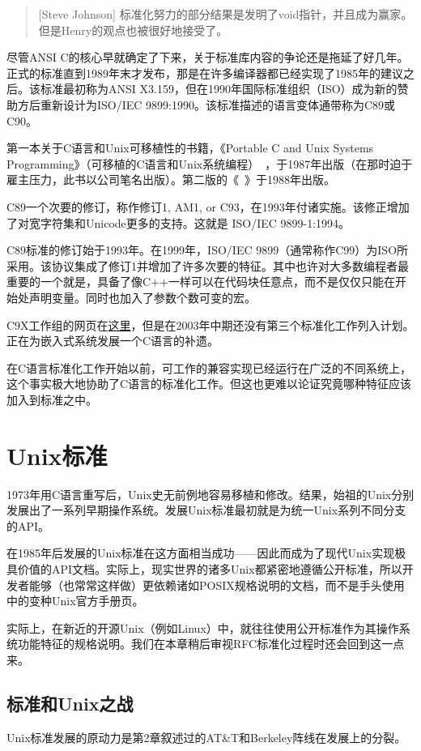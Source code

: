 \documentclass[12pt,oneside]{ctexbook}
\begin{document}
\begin{common-format}
\begin{quote}[Steve Johnson]
标准化努力的部分结果是发明了void指针，并且成为赢家。但是Henry的观点也被很好地接受了。
\end{quote}

尽管ANSI C的核心早就确定了下来，关于标准库内容的争论还是拖延了好几年。正式的标准直到1989年末才发布，那是在许多编译器都已经实现了1985年的建议之后。该标准最初称为ANSI X3.159，但在1990年国际标准组织（ISO）成为新的赞助方后重新设计为ISO/IEC 9899:1990。该标准描述的语言变体通带称为C89或C90。

第一本关于C语言和Unix可移植性的书籍，《Portable C and Unix Systems Programming》（可移植的C语言和Unix系统编程）~\cite{Lapin}，于1987年出版（在那时迫于雇主压力，此书以公司笔名出版）。第二版的《~\cite{Kernighan-Ritchie}》于1988年出版。

C89一个次要的修订，称作修订1, AM1, or C93，在1993年付诸实施。该修正增加了对宽字符集和Unicode更多的支持。这就是 ISO/IEC 9899-1:1994。

C89标准的修订始于1993年。在1999年，ISO/IEC 9899（通常称作C99）为ISO所采用。该协议集成了修订1并增加了许多次要的特征。其中也许对大多数编程者最重要的一个就是，具备了像C++一样可以在代码块任意点，而不是仅仅只能在开始处声明变量。同时也加入了参数个数可变的宏。

C9X工作组的网页在\href{http://anubis.dkuug.dk/JTC1/SC22/WG14/www/projects}{这里}，但是在2003年中期还没有第三个标准化工作列入计划。正在为嵌入式系统发展一个C语言的补遗。

在C语言标准化工作开始以前，可工作的兼容实现已经运行在广泛的不同系统上，这个事实极大地协助了C语言的标准化工作。但这也更难以论证究竟哪种特征应该加入到标准之中。

\section{Unix标准}
1973年用C语言重写后，Unix史无前例地容易移植和修改。结果，始祖的Unix分别发展出了一系列早期操作系统。发展Unix标准最初就是为统一Unix系列不同分支的API。

在1985年后发展的Unix标准在这方面相当成功——因此而成为了现代Unix实现极具价值的API文档。实际上，现实世界的诸多Unix都紧密地遵循公开标准，所以开发者能够（也常常这样做）更依赖诸如POSIX规格说明的文档，而不是手头使用中的变种Unix官方手册页。

实际上，在新近的开源Unix（例如Linux）中，就往往使用公开标准作为其操作系统功能特征的规格说明。我们在本章稍后审视RFC标准化过程时还会回到这一点来。

\subsection{标准和Unix之战}
Unix标准发展的原动力是第2章叙述过的AT\&{}T和Berkeley阵线在发展上的分裂。


\end{common-format}
\end{document}
